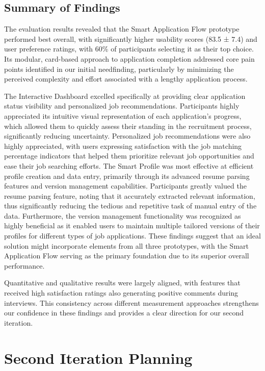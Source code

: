 \documentclass[
	letterpaper, %
]{jdf}
\begin{document}
\begin{sloppypar}
\subsection{Summary of Findings}

The evaluation results revealed that the Smart Application Flow prototype performed best overall, with significantly higher usability scores (83.5 ± 7.4) and user preference ratings, with 60\% of participants selecting it as their top choice. Its modular, card-based approach to application completion addressed core pain points identified in our initial needfinding, particularly by minimizing the perceived complexity and effort associated with a lengthy application process. 

The Interactive Dashboard excelled specifically at providing clear application status visibility and personalized job recommendations. Participants highly appreciated its intuitive visual representation of each application's progress, which allowed them to quickly assess their standing in the recruitment process, significantly reducing uncertainty. Personalized job recommendations were also highly appreciated, with users expressing satisfaction with the job matching percentage indicators that helped them prioritize relevant job opportunities and ease their job searching efforts. The Smart Profile was most effective at efficient profile creation and data entry, primarily through its advanced resume parsing features and version management capabilities. Participants greatly valued the resume parsing feature, noting that it accurately extracted relevant information, thus significantly reducing the tedious and repetitive task of manual entry of the data. Furthermore, the version management functionality was recognized as highly beneficial as it enabled users to maintain multiple tailored versions of their profiles for different types of job applications. These findings suggest that an ideal solution might incorporate elements from all three prototypes, with the Smart Application Flow serving as the primary foundation due to its superior overall performance. 

Quantitative and qualitative results were largely aligned, with features that received high satisfaction ratings also generating positive comments during interviews. This consistency across different measurement approaches strengthens our confidence in these findings and provides a clear direction for our second iteration.


\newpage
\section{Second Iteration Planning}


\end{sloppypar}
\end{document}
